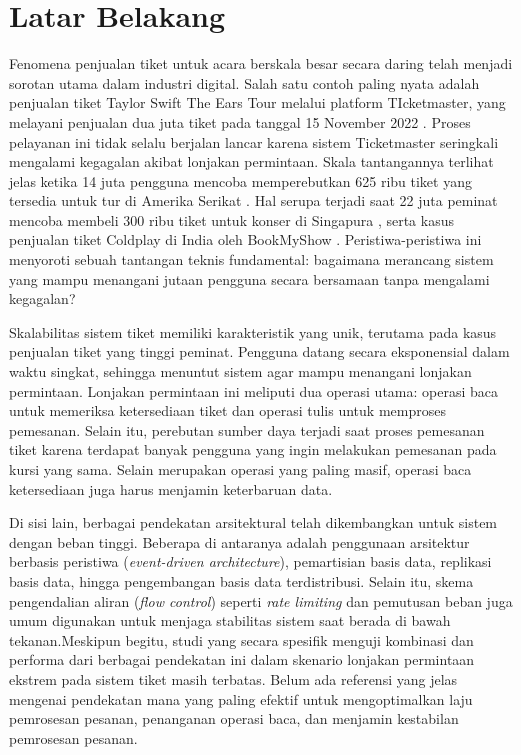 \section{Latar Belakang}
\label{sec:latar-belakang}

Fenomena penjualan tiket untuk acara berskala besar secara daring telah menjadi sorotan utama dalam industri digital. Salah satu contoh paling nyata adalah penjualan tiket Taylor Swift The Ears Tour melalui platform TIcketmaster, yang melayani penjualan dua juta tiket pada tanggal 15 November 2022 \parencite{swiftTicketmaster}. Proses pelayanan ini tidak selalu berjalan lancar karena sistem Ticketmaster seringkali mengalami kegagalan akibat lonjakan permintaan. Skala tantangannya terlihat jelas ketika 14 juta pengguna mencoba memperebutkan 625 ribu tiket yang tersedia untuk tur di Amerika Serikat \parencite{USTaylorSwift}. Hal serupa terjadi saat 22 juta peminat mencoba membeli 300 ribu tiket untuk konser di Singapura \parencite{asiaTaylorSwift}, serta kasus penjualan tiket Coldplay di India oleh BookMyShow \parencite{coldplayBookMyShow}. Peristiwa-peristiwa ini menyoroti sebuah tantangan teknis fundamental: bagaimana merancang sistem yang mampu menangani jutaan pengguna secara bersamaan tanpa mengalami kegagalan?

Skalabilitas sistem tiket memiliki karakteristik yang unik, terutama pada kasus penjualan tiket yang tinggi peminat. Pengguna datang secara eksponensial dalam waktu singkat, sehingga menuntut sistem agar mampu menangani lonjakan permintaan. Lonjakan permintaan ini meliputi dua operasi utama: operasi baca untuk memeriksa ketersediaan tiket dan operasi tulis untuk memproses pemesanan. Selain itu, perebutan sumber daya terjadi saat proses pemesanan tiket karena terdapat banyak pengguna yang ingin melakukan pemesanan pada kursi yang sama. Selain merupakan operasi yang paling masif, operasi baca ketersediaan juga harus menjamin keterbaruan data.

Di sisi lain, berbagai pendekatan arsitektural telah dikembangkan untuk sistem dengan beban tinggi. Beberapa di antaranya adalah penggunaan arsitektur berbasis peristiwa (\textit{event-driven architecture}), pemartisian basis data, replikasi basis data, hingga pengembangan basis data terdistribusi. Selain itu, skema pengendalian aliran (\textit{flow control}) seperti \textit{rate limiting} dan pemutusan beban juga umum digunakan untuk menjaga stabilitas sistem saat berada di bawah tekanan.Meskipun begitu, studi yang secara spesifik menguji kombinasi dan performa dari berbagai pendekatan ini dalam skenario lonjakan permintaan ekstrem pada sistem tiket masih terbatas. Belum ada referensi yang jelas mengenai pendekatan mana yang paling efektif untuk mengoptimalkan laju pemrosesan pesanan, penanganan operasi baca, dan menjamin kestabilan pemrosesan pesanan.

